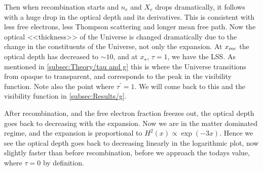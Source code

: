 \documentclass[10pt,a4paper]{article}
\begin{document}
Then when recombination starts and $n_e$ and $X_e$ drops dramatically, it follows with a huge drop in the optical depth and its derivatives. This is consistent with less free electrons, less Thompson scattering and longer mean free path. Now the optical <<thickness>> of the Universe is changed dramatically due to the change in the constituents of the Universe, not only the expansion. At $x_{\rm{rec}}$ the optical depth has decreased to $\sim 10$, and at $x_\star$, $\tau=1$, we have the LSS. As mentioned in \cref{subsec:Theory/tau and g} this is where the Universe transitions from opaque to transparent, and corresponds to the peak in the visibility function. Note also the point where $\tau^\prime = 1$. We will come back to this and the visibility function in \cref{subsec:Results/g}.

After recombination, and the free electron fraction freezes out, the optical depth goes back to decreasing with the expansion. Now we are in the matter dominated regime, and the expansion is proportional to $H^2(x) \propto \exp(-3x)$. Hence we see the optical depth goes back to decreasing linearly in the logarithmic plot, now slightly faster than before recombination, before we approach the todays value, where $\tau = 0$ by definition.
\end{document}
